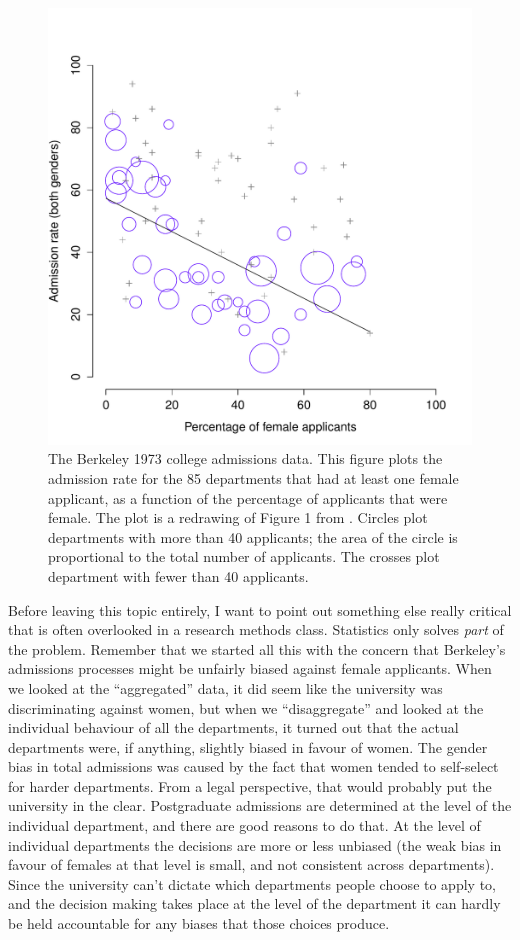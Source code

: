 \documentclass[
]{book}
\begin{document}
\begin{figure}
\centering
\includegraphics{img/whystats/berkeleyadmissions3-eps-converted-to.pdf}
\caption{\label{fig:berkeley}The Berkeley 1973 college admissions data. This figure plots the admission rate for the 85 departments that had at least one female applicant, as a function of the percentage of applicants that were female. The plot is a redrawing of Figure 1 from \citet{Bickel1975}. Circles plot departments with more than 40 applicants; the area of the circle is proportional to the total number of applicants. The crosses plot department with fewer than 40 applicants.}
\end{figure}

Before leaving this topic entirely, I want to point out something else really critical that is often overlooked in a research methods class. Statistics only solves \emph{part} of the problem. Remember that we started all this with the concern that Berkeley's admissions processes might be unfairly biased against female applicants. When we looked at the ``aggregated'' data, it did seem like the university was discriminating against women, but when we ``disaggregate'' and looked at the individual behaviour of all the departments, it turned out that the actual departments were, if anything, slightly biased in favour of women. The gender bias in total admissions was caused by the fact that women tended to self-select for harder departments. From a legal perspective, that would probably put the university in the clear. Postgraduate admissions are determined at the level of the individual department, and there are good reasons to do that. At the level of individual departments the decisions are more or less unbiased (the weak bias in favour of females at that level is small, and not consistent across departments). Since the university can't dictate which departments people choose to apply to, and the decision making takes place at the level of the department it can hardly be held accountable for any biases that those choices produce.
\end{document}
